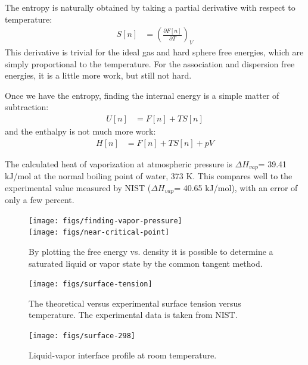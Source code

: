 \documentclass[letterpaper,twocolumn,amsmath,amssymb,prb]{revtex4-1}
\begin{document}
The entropy is naturally obtained by taking a partial derivative with
respect to temperature:
\begin{align}
  S[n] &= \left(\frac{\partial F[n]}{\partial T}\right)_{V}
\end{align}
This derivative is trivial for the ideal gas and hard sphere free
energies, which are simply proportional to the temperature.  For the
association and dispersion free energies, it is a little more work,
but still not hard.

Once we have the entropy, finding the internal energy is a simple
matter of subtraction:
\begin{align}
  U[n] &= F[n] + TS[n]
\end{align}
and the enthalpy is not much more work:
\begin{align}
  H[n] &= F[n] + TS[n] + pV
\end{align}

The calculated heat of vaporization at atmospheric pressure is
$\Delta H_{vap}$= 39.41 kJ/mol at the normal boiling point of water,
373 K. This compares well to the experimental
value measured by NIST ($\Delta H_{vap}$= 40.65 kJ/mol\cite{nistwater}), with 
an error of only a few percent.

\begin{figure}
\begin{center}
\texttt{[image: figs/finding-vapor-pressure]}\\
\texttt{[image: figs/near-critical-point]}
\end{center}
\caption{By plotting the free energy vs. density it is possible to
  determine a saturated liquid or vapor state by the common tangent
  method.  }
\label{fig:homogeneous}
\end{figure}

\begin{figure}
\begin{center}
\texttt{[image: figs/surface-tension]}
\end{center}
\caption{The theoretical versus experimental surface tension
  versus temperature. The experimental data is taken from NIST.\cite{nistwater}
}
\label{fig:surface-tension}
\end{figure}

\begin{figure}
\begin{center}
\texttt{[image: figs/surface-298]}
\end{center}
\caption{Liquid-vapor interface profile at room temperature.  }
\label{fig:liquid-vapor-profile}
\end{figure}
\end{document}
